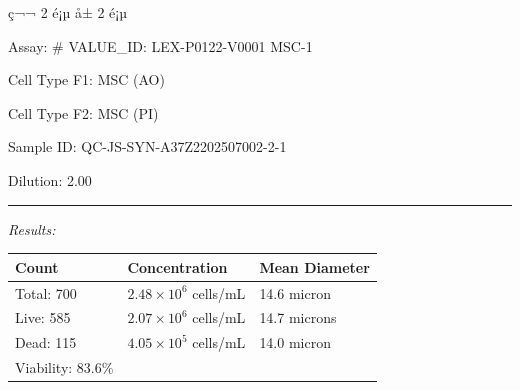 \documentclass[UTF8,10pt,a4paper,fontset=fandol]{ctexart}
\newcommand{\fieldvalue}[1]{#1}
\begin{document}
\begin{center}
\begin{center}
\begin{center}
ç¬¬ 2 é¡µ å± 2 é¡µ
\end{center}

\newpage

Assay: %
# VALUE_ID: LEX-P0122-V0001
\fieldvalue{MSC-1}

Cell Type F1: %
\fieldvalue{MSC (AO)}

Cell Type F2: %
\fieldvalue{MSC (PI)}

Sample ID: %
\fieldvalue{QC-JS-SYN-A37Z2202507002-2-1}

Dilution: %
\fieldvalue{2.00}

\noindent\rule{\textwidth}{0.4pt}

\textit{Results:}

\vspace{0.5em}

\begin{tabularx}{\textwidth}{@{}lXl@{}}
Count & Concentration & Mean Diameter \\
\hline
Total: \fieldvalue{700}
&
\fieldvalue{$2.48\times10^{6}$ cells/mL}
&
\fieldvalue{14.6 micron}
\\
Live: \fieldvalue{585}
&
\fieldvalue{$2.07\times10^{6}$ cells/mL}
&
\fieldvalue{14.7 microns}
\\
Dead: \fieldvalue{115}
&
\fieldvalue{$4.05\times10^{5}$ cells/mL}
&
\fieldvalue{14.0 micron}
\\
Viability: \fieldvalue{83.6\%}
& &
\end{tabularx}

\vspace{1em}

\begin{center}
\hspace{0.03\textwidth}


\end{center}
\end{center}
\end{center}
\end{document}
